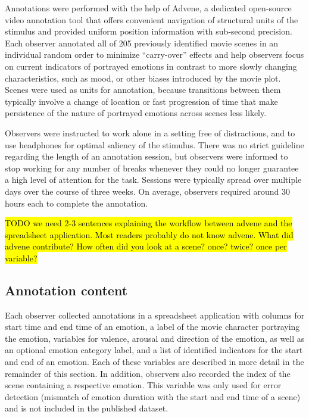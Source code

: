 Annotations were performed with the help of Advene\cite{AP2005}, a dedicated
open-source video annotation tool that offers convenient navigation of
structural units of the stimulus and provided uniform position information with
sub-second precision.  Each observer annotated all of 205 previously identified
movie scenes in an individual random order to minimize ``carry-over'' effects
and help observers focus on current indicators of portrayed emotions in
contrast to more slowly changing characteristics, such as mood, or other biases
introduced by the movie plot. Scenes were used as units for annotation, because
transitions between them typically involve a change of location or fast
progression of time that make persistence of the nature of portrayed emotions
across scenes less likely.

Observers were instructed to work alone in a setting free of distractions, and
to use headphones for optimal saliency of the stimulus. There was no strict
guideline regarding the length of an annotation session, but observers were
informed to stop working for any number of breaks whenever they could no longer
guarantee a high level of attention for the task. Sessions were typically
spread over multiple days over the course of three weeks. On average, observers
required around 30 hours each to complete the annotation.

\hl{TODO we need 2-3 sentences explaining the workflow between advene and the
spreadsheet application. Most readers probably do not know advene. What did
advene contribute? How often did you look at a scene? once? twice? once per
variable?}

\subsection*{Annotation content}

Each observer collected annotations in a spreadsheet application with columns
for start time and end time of an emotion, a label of the movie character
portraying the emotion, variables for valence, arousal and direction of the
emotion, as well as an optional emotion category label, and a list of
identified indicators for the start and end of an emotion. Each of these
variables are described in more detail in the remainder of this section. In
addition, observers also recorded the index of the scene containing a
respective emotion. This variable was only used for error detection (mismatch
of emotion duration with the start and end time of a scene) and is not included
in the published dataset.


